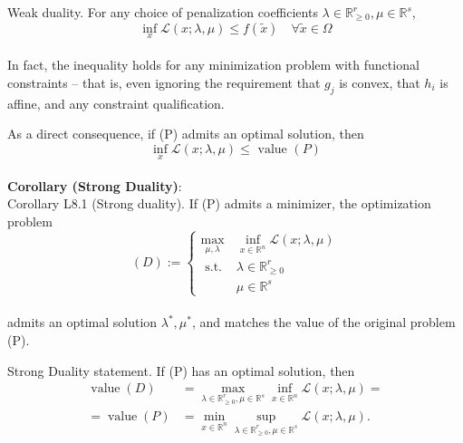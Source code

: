 \begin{theorem}[L8.2]{Weak duality.}
    For any choice of penalization coefficients $\lambda \in \mathbb{R}_{\geq 0}^r, \mu \in \mathbb{R}^s$,
    \vspace{-4pt}\\
    $$
    \inf _x \mathcal{L}(x ; \lambda, \mu) \leq f(\tilde{x}) \quad \forall \tilde{x} \in \Omega
    $$
    \vspace{-4pt}\\
    In fact, the inequality holds for any minimization problem with functional constraints -- that is, even ignoring the requirement that $g_j$ is convex, that $h_i$ is affine, and any constraint qualification.

    As a direct consequence, if (P) admits an optimal solution, then
    \vspace{-4pt}\\
    $$
    \inf _x \mathcal{L}(x ; \lambda, \mu) \leq \text { value }(P)
    $$
    \vspace{-4pt}\\
    \textbf{Corollary (Strong Duality)}:\\
    Corollary L8.1 (Strong duality). If (P) admits a minimizer, the optimization problem
    \vspace{-4pt}\\
    $$
    (D):= \begin{cases}\max _{\mu, \lambda} & \inf _{x \in \mathbb{R}^n} \mathcal{L}(x ; \lambda, \mu) \\ \text { s.t. } & \lambda \in \mathbb{R}_{\geq 0}^r \\ & \mu \in \mathbb{R}^s\end{cases}
    $$
    \vspace{-4pt}\\
    admits an optimal solution $\lambda^*, \mu^*$, and matches the value of the original problem (P).
\end{theorem}

\begin{remark}[L8.3]{Strong Duality statement.}
    If (P) has an optimal solution, then
    \vspace{-4pt}\\
    \begin{equation*}
        \begin{aligned}
            \operatorname{value}(D) &= \max _{\lambda \in \mathbb{R}_{\geq 0}^r, \mu \in \mathbb{R}^s} \inf _{x \in \mathbb{R}^n} \mathcal{L}(x ; \lambda, \mu) = \\
            =\operatorname{value}(P) &= {\min _{x \in \mathbb{R}^n} \sup _{\lambda \in \mathbb{R}_{\geq 0}^r, \mu \in \mathbb{R}_{ }^s} \mathcal{L}(x ; \lambda, \mu) .}
        \end{aligned}
    \end{equation*}
    \vspace{-4pt}
\end{remark}

